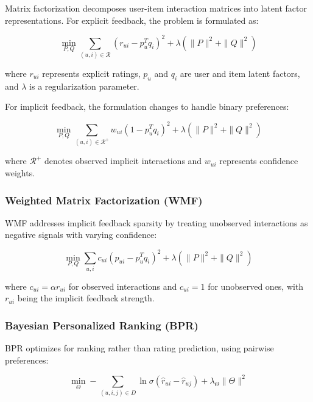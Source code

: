Matrix factorization decomposes user-item interaction matrices into latent factor representations. For explicit feedback, the problem is formulated as:

\begin{equation}
\min_{P,Q} \sum_{(u,i) \in \mathcal{R}} (r_{ui} - p_u^T q_i)^2 + \lambda (\|P\|^2 + \|Q\|^2)
\label{eq:explicit_mf}
\end{equation}

where $r_{ui}$ represents explicit ratings, $p_u$ and $q_i$ are user and item latent factors, and $\lambda$ is a regularization parameter.

For implicit feedback, the formulation changes to handle binary preferences:

\begin{equation}
\min_{P,Q} \sum_{(u,i) \in \mathcal{R}^+} w_{ui} (1 - p_u^T q_i)^2 + \lambda (\|P\|^2 + \|Q\|^2)
\label{eq:implicit_mf}
\end{equation}

where $\mathcal{R}^+$ denotes observed implicit interactions and $w_{ui}$ represents confidence weights.

\subsubsection{Weighted Matrix Factorization (WMF)}

WMF addresses implicit feedback sparsity by treating unobserved interactions as negative signals with varying confidence:

\begin{equation}
\min_{P,Q} \sum_{u,i} c_{ui} (p_{ui} - p_u^T q_i)^2 + \lambda (\|P\|^2 + \|Q\|^2)
\label{eq:wmf}
\end{equation}

where $c_{ui} = \alpha r_{ui}$ for observed interactions and $c_{ui} = 1$ for unobserved ones, with $r_{ui}$ being the implicit feedback strength.

\subsubsection{Bayesian Personalized Ranking (BPR)}

BPR optimizes for ranking rather than rating prediction, using pairwise preferences:

\begin{equation}
\min_{\Theta} -\sum_{(u,i,j) \in D} \ln \sigma(\hat{r}_{ui} - \hat{r}_{uj}) + \lambda_\Theta \|\Theta\|^2
\label{eq:bpr}
\end{equation}

